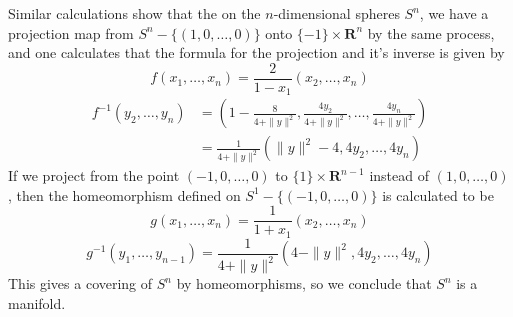 \begin{example}
%
%
%
%
    Similar calculations show that the on the $n$-dimensional spheres $S^n$, we have a projection map from $S^n - \{ (1,0,\dots,0) \}$ onto $\{ -1 \} \times \mathbf{R}^n$ by the same process, and one calculates that the formula for the projection and it's inverse is given by
    \[ f(x_1, \dots, x_n) = \frac{2}{1 - x_1}(x_2, \dots, x_n) \]
    \begin{align*}
        f^{-1}(y_2, \dots, y_n) &= \left(1 - \frac{8}{4 + \| y \|^2}, \frac{4y_2}{4 + \| y \|^2}, \dots, \frac{4y_n}{4 + \| y \|^2} \right)\\
        &= \frac{1}{4 + \| y \|^2} \left( \| y \|^2 - 4, 4y_2, \dots, 4y_n \right)
    \end{align*}
    If we project from the point $(-1,0,\dots,0)$ to $\{ 1 \} \times \mathbf{R}^{n-1}$ instead of $(1,0,\dots,0)$, then the homeomorphism defined on $S^1 - \{ (-1,0,\dots,0) \}$ is calculated to be
    \[ g(x_1, \dots, x_n) = \frac{1}{1 + x_1}(x_2, \dots, x_n) \]
    \[ g^{-1}(y_1, \dots, y_{n-1}) = \frac{1}{4 + \| y \|^2} \left( 4 - \| y \|^2, 4y_2, \dots, 4y_n \right) \]
    This gives a covering of $S^n$ by homeomorphisms, so we conclude that $S^n$ is a manifold.
\end{example}

